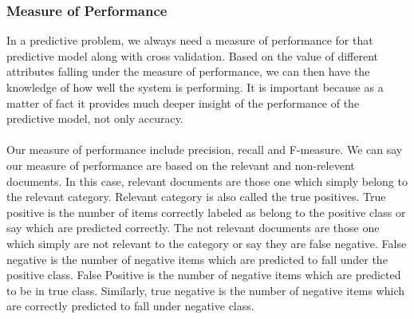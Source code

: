 {\subsubsection{Measure of Performance}
In a predictive problem, we always need a measure of performance for that predictive model along with cross validation. Based on the value of different attributes falling under 
the measure of performance, we can then have the knowledge of how well the system is performing. It is important because as a matter of fact it provides much deeper insight of the performance of
the predictive model, not only accuracy.\\
\\
Our measure of performance include precision, recall and F-measure. We can say our measure of performance are based on the relevant and non-relevent documents. In this case,
relevant documents are those one which simply belong to the relevant category. Relevant category is also called the true positives. True positive is the number of items correctly
labeled as belong to the positive class or say which are predicted correctly. The not relevant documents are those one which simply are not relevant to the category or say they are false negative. 
False negative is the number of negative items which are predicted to fall under the positive class. False Positive is the number of negative items which are predicted to be in true class.
Similarly, true negative is the number of negative items which are correctly predicted to fall under negative class.

}
